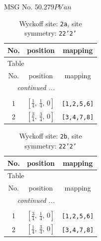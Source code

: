 \documentclass[fleqn,8pt]{jsarticle}
\begin{document}
\setcounter{MaxMatrixCols}{32}

\renewcommand{\tablename}{Table~}
\renewcommand{\figurename}{Figure~}
\begin{center}
\LARGE
MSG No. 50.279\quad$Pb'an$
\end{center}
\renewcommand{\arraystretch}{1.2}
\begin{longtable}{ccc}
\caption{Wyckoff site: {\tt 2a}, site symmetry: {\tt 22'2'}}
 \\
 \hline \hline
No. & position & mapping \\ \hline \endfirsthead

\multicolumn{2}{l}{\tablename\ \thetable{}} \\
 \hline \hline
No. & position & mapping \\ \hline \endhead

 \hline \hline
\multicolumn{2}{r}{\footnotesize\it continued ...} \\ \endfoot

 \hline \hline
\multicolumn{2}{r}{} \\ \endlastfoot

1 & $\left[ \frac{1}{4},\, \frac{1}{4},\, 0 \right]$ & {\tt [1,2,5,6]} \\ \hline
2 & $\left[ \frac{3}{4},\, \frac{3}{4},\, 0 \right]$ & {\tt [3,4,7,8]} \\
\end{longtable}
\renewcommand{\arraystretch}{1.2}
\begin{longtable}{ccc}
\caption{Wyckoff site: {\tt 2b}, site symmetry: {\tt 22'2'}}
 \\
 \hline \hline
No. & position & mapping \\ \hline \endfirsthead

\multicolumn{2}{l}{\tablename\ \thetable{}} \\
 \hline \hline
No. & position & mapping \\ \hline \endhead

 \hline \hline
\multicolumn{2}{r}{\footnotesize\it continued ...} \\ \endfoot

 \hline \hline
\multicolumn{2}{r}{} \\ \endlastfoot

1 & $\left[ \frac{3}{4},\, \frac{1}{4},\, 0 \right]$ & {\tt [1,2,5,6]} \\ \hline
2 & $\left[ \frac{1}{4},\, \frac{3}{4},\, 0 \right]$ & {\tt [3,4,7,8]} \\
\end{longtable}
\end{document}
